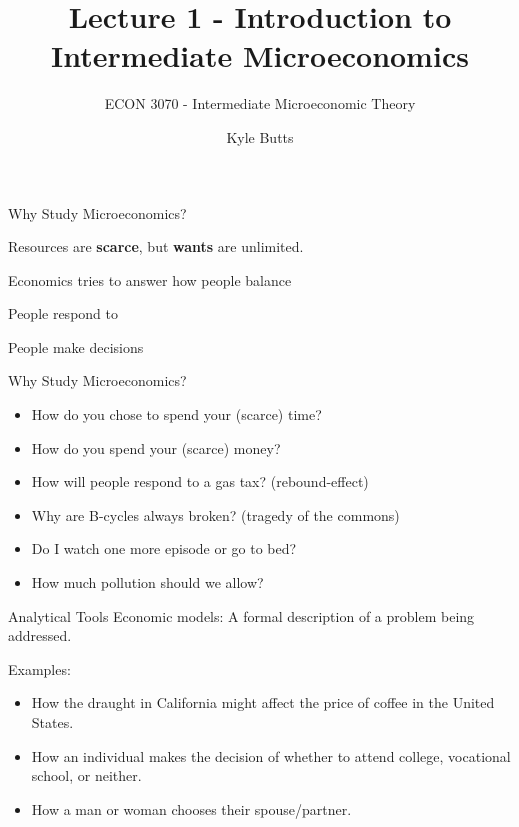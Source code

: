 \documentclass[11pt,t]{beamer}
\author{Kyle Butts}
\title{Lecture 1 - Introduction to Intermediate Microeconomics}
\subtitle{ECON 3070 - Intermediate Microeconomic Theory}
\begin{document}
\begin{frame}
  \titlepage
\end{frame}

\begin{frame}{Why Study Microeconomics?}
  \begin{center}
    Resources are \textbf{scarce}, but \textbf{wants} are unlimited.
  \end{center}

  \pause\bigskip
  \begin{center}
    Economics tries to answer how people balance 
  \end{center}

  \pause\bigskip
  \begin{center}
    People respond to 
  \end{center}

  \pause\bigskip
  \begin{center}
    People make decisions 
  \end{center}
\end{frame}

\begin{frame}{Why Study Microeconomics?}
  \begin{itemize}
    \item How do you chose to spend your (scarce) time? 
    \item How do you spend your (scarce) money?
  \end{itemize}

  \pause\bigskip
  \begin{itemize}
    \item How will people respond to a gas tax? (rebound-effect) 
    \item Why are B-cycles always broken? (tragedy of the commons)
  \end{itemize}

  \pause\bigskip
  \begin{itemize}
    \item Do I watch one more episode or go to bed? 
    \item How much pollution should we allow?
  \end{itemize}
\end{frame}

\begin{frame}{Analytical Tools}
  Economic models: A formal description of a problem being addressed.

  \bigskip
  Examples:
  \begin{itemize}
    \item How the draught in California might affect the price of coffee in the United States.
    \item How an individual makes the decision of whether to attend college, vocational school, or neither.
    \item How a man or woman chooses their spouse/partner.
  \end{itemize}
\end{frame}
\end{document}
